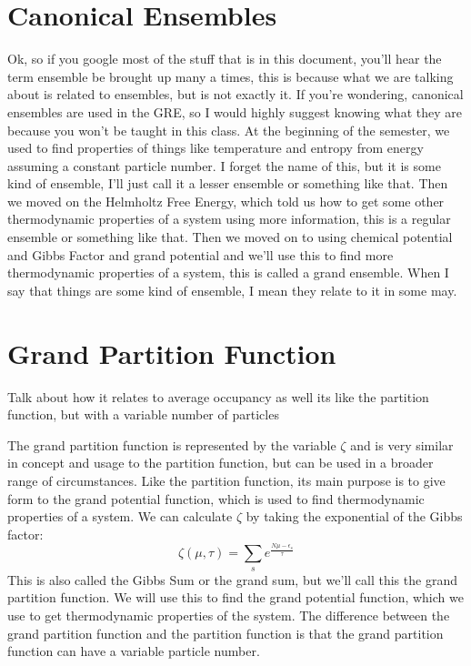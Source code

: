 \documentclass[arial]{article}
\begin{document}
\section*{Canonical Ensembles}
Ok, so if you google most of the stuff that is in this document, you'll hear the term ensemble be brought up many a times, this is because what we are talking about is related to ensembles, but is not exactly it. If you're wondering, canonical ensembles are used in the GRE, so I would highly suggest knowing what they are because you won't be taught in this class. At the beginning of the semester, we used to find properties of things like temperature and entropy from energy assuming a constant particle number. I forget the name of this, but it is some kind of ensemble, I'll just call it a lesser ensemble or something like that. Then we moved on the Helmholtz Free Energy, which told us how to get some other thermodynamic properties of a system using more information, this is a regular ensemble or something like that. Then we moved on to using chemical potential and Gibbs Factor and grand potential and we'll use this to find more thermodynamic properties of a system, this is called a grand ensemble. When I say that things are some kind of ensemble, I mean they relate to it in some may.

\section*{Grand Partition Function}
Talk about how it relates to average occupancy as well
its like the partition function, but with a variable number of particles

The grand partition function is represented by the variable $\zeta$ and is very similar in concept and usage to the partition function, but can be used in a broader range of circumstances. Like the partition function, its main purpose is to give form to the grand potential function, which is used to find thermodynamic properties of a system. We can calculate $\zeta$ by taking the exponential of the Gibbs factor:
\begin{equation}
\zeta (\mu,\tau)=\sum_{s} e^{\frac{N\mu -\epsilon_s }{\tau}}
\end{equation}
This is also called the Gibbs Sum or the grand sum, but we'll call this the grand partition function. We will use this to find the grand potential function, which we use to get thermodynamic properties of the system. The difference between the grand partition function and the partition function is that the grand partition function can have a variable particle number.
\end{document}
